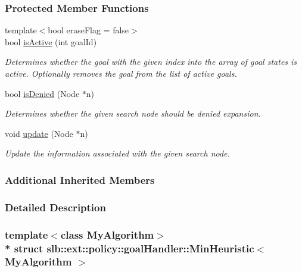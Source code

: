 \subsubsection*{Protected Member Functions}
\begin{DoxyCompactItemize}
\item 
{\footnotesize template$<$bool erase\+Flag = false$>$ }\\bool \hyperlink{structslb_1_1ext_1_1policy_1_1goalHandler_1_1MinHeuristic_a19b3a6aea0c0081e4f89b462aa1eb798}{is\+Active} (int goal\+Id)
\begin{DoxyCompactList}\small\item\em Determines whether the goal with the given index into the array of goal states is active. Optionally removes the goal from the list of active goals. \end{DoxyCompactList}\item 
bool \hyperlink{structslb_1_1ext_1_1policy_1_1goalHandler_1_1MinHeuristic_a2d834f5a6adf6f78f3e71d034da8ce00}{is\+Denied} (Node $\ast$n)
\begin{DoxyCompactList}\small\item\em Determines whether the given search node should be denied expansion. \end{DoxyCompactList}\item 
void \hyperlink{structslb_1_1ext_1_1policy_1_1goalHandler_1_1MinHeuristic_a1eb0a18fac3ea555744fedeaaae22115}{update} (Node $\ast$n)
\begin{DoxyCompactList}\small\item\em Update the information associated with the given search node. \end{DoxyCompactList}\end{DoxyCompactItemize}
\subsubsection*{Additional Inherited Members}


\subsubsection{Detailed Description}
\subsubsection*{template$<$class My\+Algorithm$>$\\*
struct slb\+::ext\+::policy\+::goal\+Handler\+::\+Min\+Heuristic$<$ My\+Algorithm $>$}

